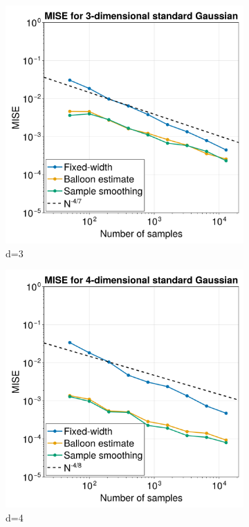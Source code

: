 \documentclass{article}
\begin{document}
\begin{figure}
\begin{subfigure}{.5\textwidth}
  \includegraphics[width=.8\linewidth]{images/MISE_d=3.png}
  \caption{d=3}
  \label{fig:MISE-3}
\end{subfigure}%
\begin{subfigure}{.5\textwidth}
  \centering
  \includegraphics[width=.8\linewidth]{images/MISE_d=4.png}
  \caption{d=4}
  \label{fig:MISE-4}
\end{subfigure}
\begin{subfigure}{.5\textwidth}
  \centering

\end{subfigure}
\end{figure}
\end{document}
